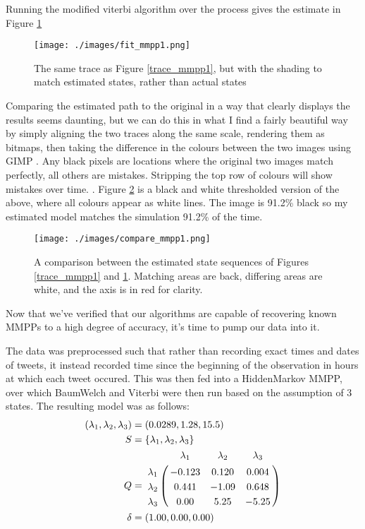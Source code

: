 Running the modified viterbi algorithm over the process gives the estimate in Figure \ref{fit_mmpp1}

\begin{figure}[h!]
\texttt{[image: ./images/fit\_mmpp1.png]}
\caption{The same trace as Figure \ref{trace_mmpp1}, but with the shading to match estimated states, rather than actual states}
\label{fit_mmpp1}
\end{figure}

Comparing the estimated path to the original in a way that clearly displays the results seems daunting, but we can do this in what I find a fairly beautiful way by simply aligning the two traces along the same scale, rendering them as bitmaps, then taking the difference in the colours between the two images using GIMP
. Any black pixels are locations where the original two images match perfectly, all others are mistakes. Stripping the top row of colours will show mistakes over time. %
. Figure \ref{compare_mmpp1} is a black and white thresholded version of the above, where all colours appear as white lines. The image is 91.2\% black so my estimated model matches the simulation 91.2\% of the time.

\begin{figure}[h!]
\texttt{[image: ./images/compare\_mmpp1.png]}
\caption{A comparison between the estimated state sequences of Figures \ref{trace_mmpp1} and \ref{fit_mmpp1}. Matching areas are back, differing areas are white, and the axis is in red for clarity.}
\label{compare_mmpp1}
\end{figure}

Now that we've verified that our algorithms are capable of recovering known MMPPs to a high degree of accuracy, it's time to pump our data into it.

The data was preprocessed such that rather than recording exact times and dates of tweets, it instead recorded time since the beginning of the observation in hours at which each tweet occured. This was then fed into a HiddenMarkov MMPP, over which BaumWelch and Viterbi were then run based on the assumption of 3 states. The resulting model was as follows:
\clearpage
\begin{align*}
(\lambda_1,\lambda_2,\lambda_3) &= (0.0289,1.28,15.5)\\
S &= \{\lambda_1,\lambda_2,\lambda_3\}\\
Q &= \bordermatrix{      & \lambda_1 & \lambda_2 & \lambda_3\cr
                \lambda_1 & -0.123 & 0.120 & 0.004 \cr
                \lambda_2 & 0.441 & -1.09 & 0.648 \cr
                \lambda_3 & 0.00 & 5.25 & -5.25 \cr
			}\\
\delta &= (1.00,0.00,0.00)
\end{align*}

